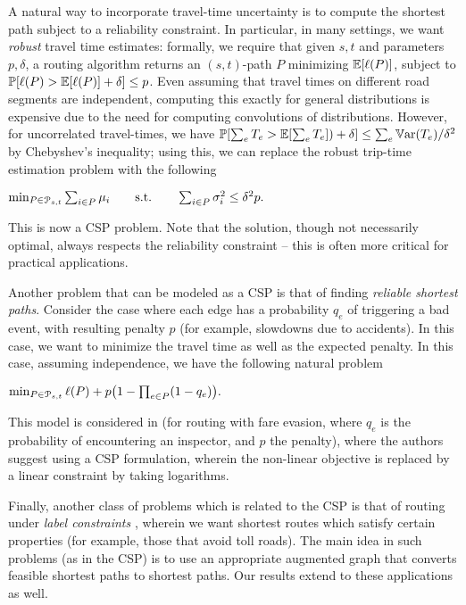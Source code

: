 A natural way to incorporate travel-time uncertainty is to compute the shortest path subject to a reliability constraint.
In particular, in many settings, we want \emph{robust} travel time estimates: formally, we require that given $s,t$ and parameters $p,\delta$, a routing algorithm returns an $(s,t)$-path $P$ minimizing $\mathbb{E}[\ell(P)]$, subject to $\mathbb{P}[\ell(P)>\mathbb{E}[\ell(P)]+\delta]\leq p$.
Even assuming that travel times on different road segments are independent, computing this exactly for general distributions is expensive due to the need for computing convolutions of distributions. However, for uncorrelated travel-times, we have $\mathbb{P}[\sum_eT_e>\mathbb{E}[\sum_eT_e])+\delta]\leq \sum_e\mathbb{V}\textnormal{ar}(T_e)/\delta^2$ by Chebyshev's inequality; using this, we can replace the robust trip-time estimation problem with the following
\begin{center}
$\min_{ P\in\mathcal{P}_{s,t}}\sum_{i\in P}\mu_i \qquad \text{s.t.}\qquad \sum_{i\in P}\sigma^2_i\leq \delta^2p.$
\end{center}
This is now a CSP problem. Note that the solution, though not necessarily optimal, always respects the reliability constraint -- this is often more critical for practical applications.


Another problem that can be modeled as a CSP is that of finding \emph{reliable shortest paths}.
Consider the case where each edge has a probability $q_e$ of triggering a bad event, with resulting penalty $p$ (for example, slowdowns due to accidents).
In this case, we want to minimize the travel time as well as the expected penalty.
In this case, assuming independence, we have the following natural problem
\begin{center}
$\min_{P\in\Pst} \ell(P)+p\prn*{1-\prod_{e\in P}(1-q_e)}.$
\end{center}
This model is considered in \citet{fareevasion} (for routing with fare evasion, where $q_e$ is the probability of encountering an inspector, and $p$ the penalty), where the authors suggest using a CSP formulation, wherein the non-linear objective is replaced by a linear constraint by taking logarithms.

Finally, another class of problems which is related to the CSP is that of routing under \emph{label constraints} \cite{language_csp,rice_csp}, wherein we want shortest routes which satisfy certain properties (for example, those that avoid toll roads). The main idea in such problems (as in the CSP) is to use an appropriate augmented graph that converts feasible shortest paths to shortest paths. Our results extend to these applications as well.

